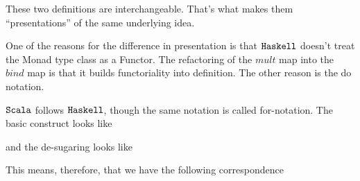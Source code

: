 These two definitions are interchangeable. That's what makes them
``presentations'' of the same underlying idea.

One of the reasons for the difference in presentation is that $\texttt{Haskell}$
doesn't treat the Monad type class as a Functor. The refactoring of
the $mult$ map into the $bind$ map is that it builds functoriality
into definition. The other reason is the do notation.


 
 
 

$\texttt{Scala}$ follows $\texttt{Haskell}$, though the same notation is called
for-notation. The basic construct looks like


and the de-sugaring looks like


This means, therefore, that we have the following correspondence



